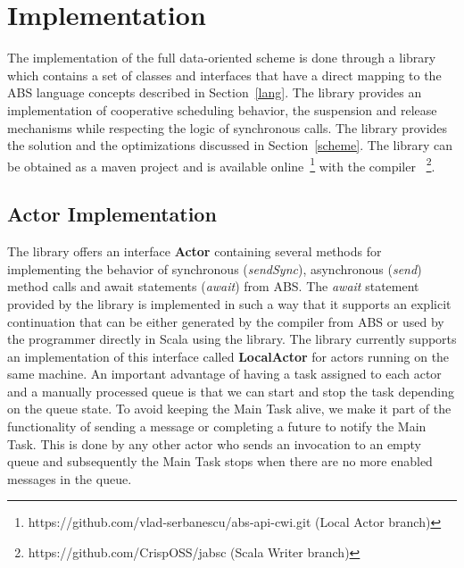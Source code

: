 \section{Implementation}
\label{run}
The implementation of the full data-oriented scheme is done through a library which contains a set of classes and interfaces that have a direct mapping to the ABS language concepts described in Section~\ref{lang}. The library provides an implementation of cooperative scheduling behavior, the suspension and release mechanisms while respecting the logic of synchronous calls. The library provides the solution and the optimizations discussed in Section~\ref{scheme}. The library can be obtained as a maven project and is available online~\footnote{https://github.com/vlad-serbanescu/abs-api-cwi.git (Local Actor branch)} with the compiler ~\footnote{https://github.com/CrispOSS/jabsc  (Scala Writer branch)}.





\subsection{Actor Implementation}
The library offers an interface \textbf{Actor} containing several methods for implementing the behavior of synchronous (\textit{sendSync}), asynchronous (\textit{send}) method calls and await statements (\textit{await}) from ABS. The \textit{await} statement provided by the library is implemented in such a way that it supports an explicit continuation that can be either generated by the compiler from ABS or used by the programmer directly in Scala using the library.  The library currently supports an implementation of this interface called \textbf{LocalActor} for actors running on the same machine. An important advantage of having a task assigned to each actor and a manually processed queue is that we can start and stop the task depending on the queue state. To avoid keeping the Main Task alive, we make it part of the functionality of sending a message or completing a future to notify the Main Task. This is done by any other actor who sends an invocation to an empty queue and subsequently the Main Task stops when there are no more enabled messages in the queue. 

